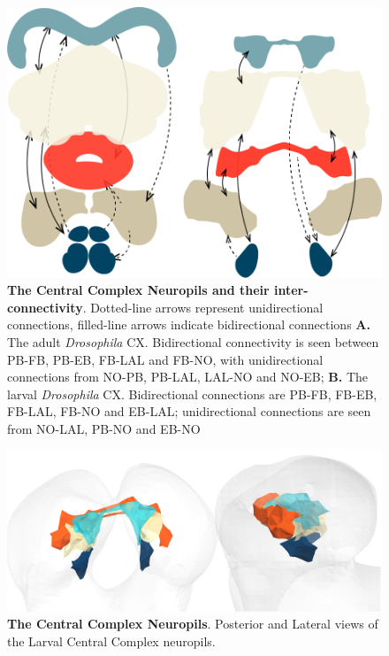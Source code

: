 \documentclass{article}
\begin{document}
    \begin{figure}
        \centering
        \includegraphics[width=12cm]{Images/CX_new.png}
        \caption{\textbf{The Central Complex Neuropils and their inter-connectivity}. Dotted-line arrows represent unidirectional connections, filled-line arrows indicate bidirectional connections  \textbf{A.} The adult \textit{\textit{Drosophila}} CX. Bidirectional connectivity is seen between PB-FB, PB-EB, FB-LAL and FB-NO, with unidirectional connections from NO-PB, PB-LAL, LAL-NO and NO-EB; \textbf{B.} The larval \textit{Drosophila} CX. Bidirectional connections are  PB-FB, FB-EB, FB-LAL, FB-NO and EB-LAL; unidirectional connections are seen from NO-LAL, PB-NO and EB-NO}
        \label{fig:cxdiagram}
     \end{figure}

     \begin{figure}
      \centering
      \includegraphics[width=12cm]{Images/Figure neurons/cx_orthographic.pdf}
      \caption{\textbf{The Central Complex Neuropils}. Posterior and Lateral views of the Larval Central Complex neuropils. }

     \end{figure}
\end{document}
